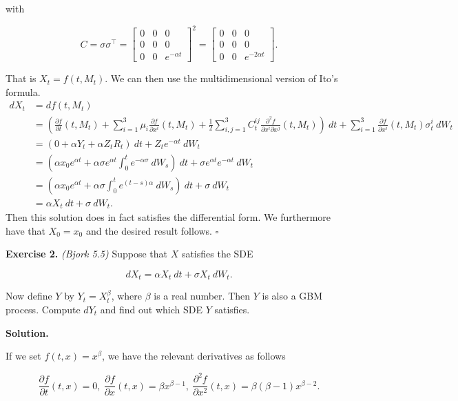 \documentclass[a4paper,12pt,openany]{book}
\begin{document}
with

\[
C=\sigma \sigma^\top =\begin{bmatrix}0 &0  &0 \\ 0 & 0 &0 \\ 0 & 0 & e^{-\alpha t}\end{bmatrix}^2=\begin{bmatrix}0 &0  &0 \\ 0 & 0 &0 \\ 0 & 0 & e^{-2\alpha t}\end{bmatrix}.
\]

That is \(X_t=f(t,M_t)\). We can then use the multidimensional version of Ito's formula.
\begin{align*}
dX_t&=df(t,M_t)\\
&=\left(\frac{\partial f}{\partial t}(t,M_t)+\sum_{i=1}^3\mu_i \frac{\partial f}{\partial x^i}(t,M_t)+\frac{1}{2}\sum_{i,j=1}^3 C^{ij}_t\frac{\partial^2 f}{\partial x^i\partial x^j}(t,M_t)\right)\ dt + \sum_{i=1}^3 \frac{\partial f}{\partial x^i}(t,M_t) \sigma^i_t\ dW_t\\
&=\left(0+\alpha Y_t+\alpha Z_t R_t\right)\ dt + Z_te^{-\alpha t}\ dW_t\\
&=\left(\alpha x_0e^{\alpha t}+\alpha \sigma e^{\alpha t} \int_0^t e^{-\alpha \sigma}\ dW_s\right)\ dt + \sigma e^{\alpha t}e^{-\alpha t}\ dW_t\\
&=\left(\alpha x_0e^{\alpha t}+\alpha \sigma  \int_0^t e^{(t-s)\alpha }\ dW_s\right)\ dt + \sigma \ dW_t\\
&=\alpha X_t\ dt + \sigma \ dW_t.
\end{align*}
Then this solution does in fact satisfies the differential form. We furthermore have that \(X_0=x_0\) and the desired result follows. \(\square\)

\textbf{Exercise 2.} \emph{(Bjork 5.5)} Suppose that \(X\) satisfies the SDE

\[
dX_t = \alpha X_t\ dt + \sigma X_t\ dW_t.
\]

Now define \(Y\) by \(Y_t = X^\beta_t\), where \(\beta\) is a real number. Then \(Y\) is also a GBM process. Compute \(dY_t\) and find out which SDE \(Y\) satisfies.

\textbf{Solution.}

If we set \(f(t,x)=x^\beta\), we have the relevant derivatives as follows

\[
\frac{\partial f}{\partial t}(t,x)=0,\ \frac{\partial f}{\partial x}(t,x)=\beta x^{\beta -1},\ \frac{\partial^2 f}{\partial x^2}(t,x)=\beta (\beta -1) x^{\beta -2}.
\]
\end{document}
